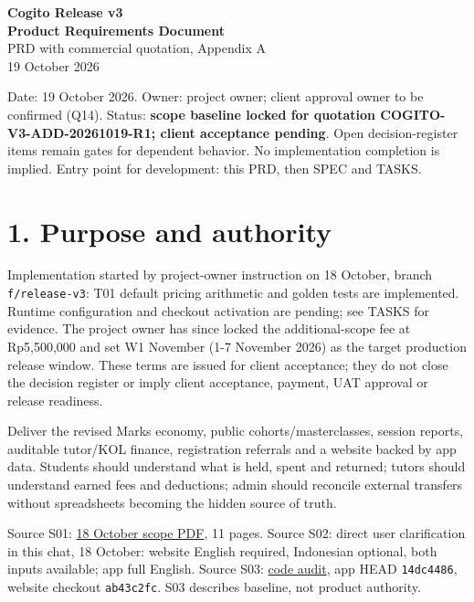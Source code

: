 \documentclass[11pt,a4paper]{article}
\begin{document}
\begin{center}
{\LARGE\textbf{Cogito Release v3}}\\[4pt]
{\Large\textbf{Product Requirements Document}}\\[5pt]
{\normalsize PRD with commercial quotation, Appendix A}\\[4pt]
{\normalsize 19 October 2026}
\end{center}
\vspace{1em}
Date: 19 October 2026. Owner: project owner; client approval owner to be confirmed (Q14). Status: \textbf{scope baseline locked for quotation COGITO-V3-ADD-20261019-R1; client acceptance pending}. Open decision-register items remain gates for dependent behavior. No implementation completion is implied. Entry point for development: this PRD, then SPEC and TASKS.

\section{1. Purpose and authority}\label{purpose-and-authority}

Implementation started by project-owner instruction on 18 October, branch \texttt{f/release-v3}: T01 default pricing arithmetic and golden tests are implemented. Runtime configuration and checkout activation are pending; see TASKS for evidence. The project owner has since locked the additional-scope fee at Rp5,500,000 and set W1 November (1-7 November 2026) as the target production release window. These terms are issued for client acceptance; they do not close the decision register or imply client acceptance, payment, UAT approval or release readiness.

Deliver the revised Marks economy, public cohorts/masterclasses, session reports, auditable tutor/KOL finance, registration referrals and a website backed by app data. Students should understand what is held, spent and returned; tutors should understand earned fees and deductions; admin should reconcile external transfers without spreadsheets becoming the hidden source of truth.

Source S01: \href{RELEASE-SCOPE-POST-MEETING.pdf}{18 October scope PDF}, 11 pages. Source S02: direct user clarification in this chat, 18 October: website English required, Indonesian optional, both inputs available; app full English. Source S03: \href{../../docs/client/RELEASE-V3-AUDIT.md}{code audit}, app HEAD \texttt{14dc4486}, website checkout \texttt{ab43c2fc}. S03 describes baseline, not product authority.
\end{document}
